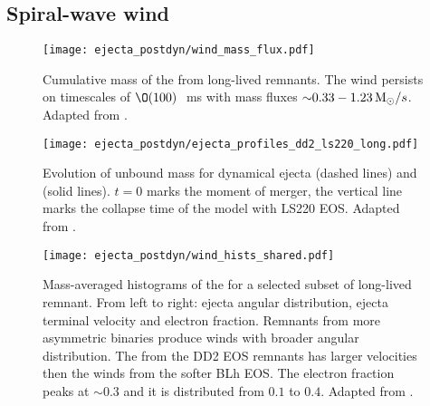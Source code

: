 \subsection{Spiral-wave wind} \label{sec:bns_sims:sww}

\begin{figure}[t]
    \centering 
    \texttt{[image: ejecta\_postdyn/wind\_mass\_flux.pdf]}
    \caption{Cumulative mass of the \swind{} from long-lived
        remnants. The wind persists on timescales of $\O(100)\,$~ms with
        mass fluxes ${\sim}0.33-1.23\,{\text{M}_{\odot}}/s$.
        Adapted from \citet{Nedora:2020pak}.
    }
    \label{fig:mej:bern}
\end{figure}

\begin{figure}[t]
    \centering 
    \texttt{[image: ejecta\_postdyn/ejecta\_profiles\_dd2\_ls220\_long.pdf]}
    \caption{Evolution of unbound mass for dynamical ejecta
        (dashed lines)
        and \swind{}
        (solid lines). $t=0$ marks the moment of merger, the vertical
        line marks the collapse time of the model with LS220 \ac{EOS}.
        Adapted from \cite{Nedora:2019jhl}.
    }
    \label{fig:mej:bern_short_long}
\end{figure}

\begin{figure*}[t]
    \centering 
    \texttt{[image: ejecta\_postdyn/wind\_hists\_shared.pdf]}
    \caption{Mass-averaged histograms of the \swind{} for a selected
        subset of long-lived remnant. From left to right: ejecta angular
        distribution, ejecta terminal velocity and electron
        fraction. Remnants from more asymmetric binaries produce winds
        with broader angular distribution.
        The \swind{} from the DD2 EOS remnants has larger velocities
        then the winds from the softer BLh EOS. The electron fraction
        peaks at ${\sim}0.3$ and it is distributed from $0.1$ to $0.4$.
        Adapted from \citet{Nedora:2020pak}.
    }
    \label{fig:ejecta:bern:hist}
\end{figure*}


